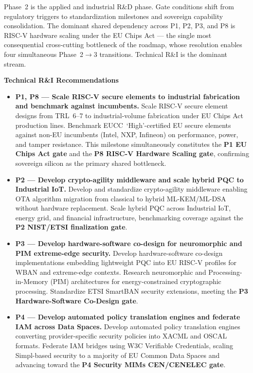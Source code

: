 \documentclass{ieeeaccess}
\begin{document}
Phase~2 is the applied and industrial R\&D phase. Gate conditions shift
from regulatory triggers to standardization milestones and sovereign
capability consolidation. The dominant shared dependency across P1, P2,
P3, and P8 is RISC-V hardware scaling under the EU Chips Act --- the
single most consequential cross-cutting bottleneck of the roadmap, whose
resolution enables four simultaneous Phase~2$\to$3 transitions. Technical
R\&I is the dominant stream.

\textbf{Technical R\&I Recommendations}

\begin{itemize}

    \item \textbf{P1, P8 --- Scale RISC-V secure elements to industrial
    fabrication and benchmark against incumbents.}
    Scale RISC-V secure element designs from TRL~6--7 to
    industrial-volume fabrication under EU Chips Act production lines.
    Benchmark EUCC~`High'-certified EU secure elements against non-EU
    incumbents (Intel, NXP, Infineon) on performance, power, and
    tamper resistance. This milestone simultaneously constitutes the
    \textbf{P1 EU Chips Act gate} and the
    \textbf{P8 RISC-V Hardware Scaling gate}, confirming sovereign
    silicon as the primary shared bottleneck.

    \item \textbf{P2 --- Develop crypto-agility middleware and scale
    hybrid PQC to Industrial IoT.}
    Develop and standardize crypto-agility middleware enabling OTA
    algorithm migration from classical to hybrid ML-KEM/ML-DSA without
    hardware replacement. Scale hybrid PQC across Industrial IoT,
    energy grid, and financial infrastructure, benchmarking coverage
    against the \textbf{P2 NIST/ETSI finalization gate}.

    \item \textbf{P3 --- Develop hardware-software co-design for
    neuromorphic and PIM extreme-edge security.}
    Develop hardware-software co-design implementations embedding
    lightweight PQC into EU RISC-V profiles for WBAN and extreme-edge
    contexts. Research neuromorphic and Processing-in-Memory (PIM)
    architectures for energy-constrained cryptographic processing.
    Standardize ETSI SmartBAN security extensions, meeting the
    \textbf{P3 Hardware-Software Co-Design gate}.

    \item \textbf{P4 --- Develop automated policy translation engines
    and federate IAM across Data Spaces.}
    Develop automated policy translation engines converting
    provider-specific security policies into XACML and OSCAL formats.
    Federate IAM bridges using W3C Verifiable Credentials, scaling
    Simpl-based security to a majority of EU Common Data Spaces and
    advancing toward the \textbf{P4 Security MIMs CEN/CENELEC gate}.


\end{itemize}
\end{document}
